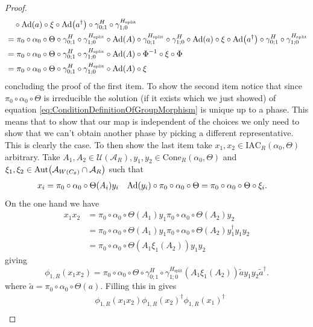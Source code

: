 \documentclass[12pt,a4paper,twoside]{article}
\newcommand{\IAC}{\textrm{IAC}}
\let\originalleft\left
\let\originalright\right
\renewcommand{\left}{\mathopen{}\mathclose\bgroup\originalleft}
\renewcommand{\right}{\aftergroup\egroup\originalright}
\newcommand{\UU}{\mathcal U}
\renewcommand{\AA}{\mathcal A}
\newcommand{\Ad}[1]{\textrm{Ad}\left(#1\right)}
\newcommand{\Aut}[1]{\textrm{Aut}\left(#1\right)}
\theoremstyle{definition}
\numberwithin{equation}{section}
\begin{document}
\begin{proof}
\begin{align}
		\nonumber
		&\quad\circ\Ad{a}\circ\xi\circ\Ad{a^\dagger}\circ\gamma^H_{0;1}\circ\gamma^{H_\text{split}}_{1;0}\\
		&=\pi_0\circ\alpha_0\circ\Theta\circ\gamma^H_{0;1}\circ\gamma^{H_\text{split}}_{1;0}\circ\Ad{A}\circ\gamma^{H_\text{split}}_{0;1}\circ\gamma^H_{1;0}\circ\Ad{a}\circ\xi\circ\Ad{a^\dagger}\circ\gamma^H_{0;1}\circ\gamma^{H_\text{split}}_{1;0}\\
		&=\pi_0\circ\alpha_0\circ\Theta\circ\gamma^H_{0;1}\circ\gamma^{H_\text{split}}_{1;0}\circ\Ad{A}\circ\Phi^{-1}\circ\xi\circ\Phi\\
		&=\pi_0\circ\alpha_0\circ\Theta\circ\gamma^H_{0;1}\circ\gamma^{H_\text{split}}_{1;0}\circ\Ad{A}\circ\xi
	\end{align}
	concluding the proof of the first item. To show the second item notice that since $\pi_0\circ\alpha_0\circ\Theta$ is irreducible the solution (if it exists which we just showed) of equation \eqref{eq:ConditionDefinitionOfGroupMorphism} is unique up to a phase. This means that to show that our map is independent of the choices we only need to show that we can't obtain another phase by picking a different representative. This is clearly the case. To then show the last item take $x_1,x_2\in \IAC_R(\alpha_0,\Theta)$ arbitrary. Take $A_1,A_2\in\UU(\AA_R),y_1,y_2\in \textrm{Cone}_R(\alpha_0,\Theta)$ and $\xi_1,\xi_2\in\Aut{\AA_{W(C_\theta)}\cap\AA_R}$ such that
	\begin{align}
		x_i&=\pi_0\circ\alpha_0\circ\Theta(A_i)y_i&\Ad{y_i}\circ\pi_0\circ\alpha_0\circ\Theta&=\pi_0\circ\alpha_0\circ\Theta\circ\xi_i.
	\end{align}
	On the one hand we have
	\begin{align}
		x_1x_2&=\pi_0\circ\alpha_0\circ\Theta(A_1)y_1\pi_0\circ\alpha_0\circ\Theta(A_2)y_2\\
		&=\pi_0\circ\alpha_0\circ\Theta(A_1)y_1\pi_0\circ\alpha_0\circ\Theta(A_2)y_1^{\dagger}y_1y_2\\
		&=\pi_0\circ\alpha_0\circ\Theta(A_1\xi_1(A_2))y_1y_2
	\end{align}
	giving
	\begin{equation}
		\phi_{1,R}(x_1x_2)=\pi_0\circ\alpha_0\circ\Theta\circ\gamma^H_{0;1}\circ\gamma^{H_\text{split}}_{1;0}(A_1\xi_1(A_2))\tilde{a}y_1y_2\tilde{a}^\dagger.
	\end{equation}
	where $\tilde{a}=\pi_0\circ\alpha_0\circ\Theta(a)$. Filling this in gives
	\begin{align}
		&\phi_{1,R}(x_1x_2)\phi_{1,R}(x_2)^\dagger\phi_{1,R}(x_1)^\dagger\\

\end{align}
\end{proof}
\end{document}

